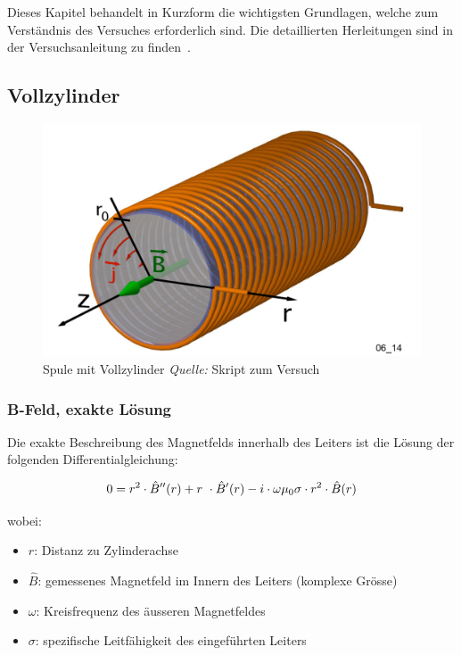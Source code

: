 Dieses Kapitel  behandelt in Kurzform  die wichtigsten Grundlagen,  welche zum
Verst\"andnis des Versuches erforderlich sind. Die detaillierten Herleitungen
sind in der Versuchsanleitung zu finden~\cite{ref:looser:skineffekt}.


\subsection{Vollzylinder}
\label{sec:arbgru:subsec:vollzylinder}

\begin{figure}[th!]
    \centering
    \includegraphics[width=.33\textwidth]{images/spule-vollzylinder.png}
    \caption{Spule mit Vollzylinder \emph{Quelle:} Skript zum Versuch~\cite{ref:looser:skineffekt}}
    \label{fig:looser:vollzylinder}
\end{figure}


\subsubsection{B-Feld, exakte L\"osung}
\label{sec:arbgru:subsec:vollzylinder:bFeldexakt}


Die exakte Beschreibung des Magnetfelds innerhalb des Leiters ist die L\"osung der
folgenden Differentialgleichung:

\begin{equation}
    \label{eq:vollzylinder:DLG}
        0 = r^2 \cdot \hat{B}'' (r) + r\ \cdot \hat{B}' (r) - i \cdot \omega\mu_0\sigma \cdot r^2 \cdot \hat{B} (r) \\
\end{equation}

wobei:

\begin{itemize}
    \item[]
        $r$: Distanz zu Zylinderachse
    \item[]
        $\hat{B}$: gemessenes Magnetfeld im Innern des Leiters (komplexe Gr\"osse)
    \item[]
        $\omega$: Kreisfrequenz des \"ausseren Magnetfeldes
    \item[]
        $\sigma$: spezifische Leitf\"ahigkeit des eingef\"uhrten Leiters
\end{itemize}


